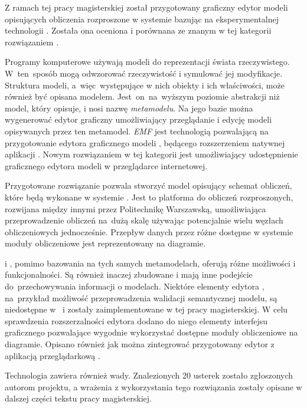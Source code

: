 Z ramach tej pracy magisterskiej został przygotowany graficzny edytor modeli
opisujących obliczenia rozproszone w systemie \BalticLSC{} bazując na
eksperymentalnej technologii \SiriusWeb{}. Została ona oceniona i porównana ze
znanym w tej kategorii rozwiązaniem \SiriusDesktop{}.

Programy komputerowe używają modeli do reprezentacji świata rzeczywistego.
W~ten~sposób mogą odwzorować rzeczywistość i symulować jej modyfikacje.
Struktura
modeli, a~więc~występujące w nich obiekty i ich właściwości, może również być
opisana
modelem. Jest~on~na~wyższym poziomie abstrakcji niż model, który opisuje, i
nosi nazwę \emph{metamodelu}.
Na jego bazie można wygenerować edytor graficzny umożliwiający przeglądanie
i edycję modeli opisywanych przez ten metamodel. \emph{\acrlong{EMF}} jest
technologią pozwalającą na przygotowanie edytora graficznego modeli
\SiriusDesktop{},
będącego rozszerzeniem natywnej aplikacji \Eclipse{}. Nowym rozwiązaniem w tej
kategorii jest \SiriusWeb{} umożliwiający udostępnienie graficznego edytora
modeli w przeglądarce internetowej.

Przygotowane rozwiązanie pozwala stworzyć model opisujący schemat obliczeń,
które będą wykonane w systemie \BalticLSC{}. Jest to platforma do obliczeń
rozproszonych, rozwijana między innymi przez Politechnikę Warszawską,
umożliwiająca przeprowadzenie obliczeń na~dużą skalę używając potencjalnie
wielu węzłach obliczeniowych jednocześnie.
Przepływ danych przez różne dostępne w systemie moduły obliczeniowe jest
reprezentowany na diagramie.

\SiriusDesktop{} i \SiriusWeb{}, pomimo bazowania na tych samych metamodelach,
oferują różne możliwości i funkcjonalności. Są również inaczej zbudowane i mają
inne podejście do~przechowywania informacji o modelach. Niektóre elementy
edytora \SiriusDesktop{}, na~przykład możliwość przeprowadzenia walidacji
semantycznej modelu, są niedostępne w~\SiriusWeb{} i zostały zaimplementowane w
tej pracy magisterskiej. W celu sprawdzenia rozszerzalności edytora dodano do
niego elementy interfejsu graficznego pozwalające wygodnie wykorzystać
dostępne moduły obliczeniowe na diagramie. Opisano również jak można
zintegrować przygotowany edytor z aplikacją przeglądarkową \BalticLSC{}.

Technologia \SiriusWeb{} zawiera również wady. Znalezionych 20 usterek zostało
zgłoszonych autorom projektu, a wrażenia z wykorzystania tego rozwiązania
zostały opisane w dalszej części tekstu pracy magisterskiej.
